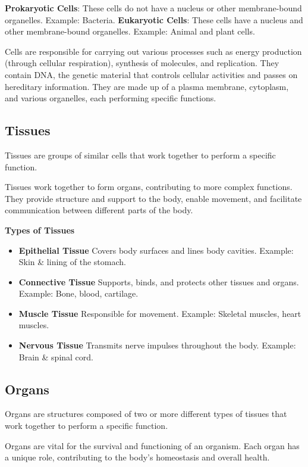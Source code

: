 \documentclass{article}
\begin{document}
\textbf{Prokaryotic Cells}: These cells do not have a nucleus or other membrane-bound organelles. Example: Bacteria.
\textbf{Eukaryotic Cells}: These cells have a nucleus and other membrane-bound organelles. Example: Animal and plant cells.

Cells are responsible for carrying out various processes such as energy production (through cellular respiration), synthesis of molecules, and replication.
They contain DNA, the genetic material that controls cellular activities and passes on hereditary information. They are made up of a plasma membrane, cytoplasm, and various organelles, each performing specific functions. \cite{stavans_1993_the}

\subsection{Tissues}
Tissues are groups of similar cells that work together to perform a specific function.

Tissues work together to form organs, contributing to more complex functions.
They provide structure and support to the body, enable movement, and facilitate communication between different parts of the body.

\textbf{Types of Tissues}
\begin{itemize}
    \item \textbf{Epithelial Tissue} Covers body surfaces and lines body cavities. Example: Skin \& lining of the stomach.
    \item \textbf{Connective Tissue} Supports, binds, and protects other tissues and organs. Example: Bone, blood, cartilage.
    \item \textbf{Muscle Tissue} Responsible for movement. Example: Skeletal muscles, heart muscles.
    \item \textbf{Nervous Tissue} Transmits nerve impulses throughout the body. Example: Brain \& spinal cord.
    \cite{overholtzer_2008_the}
\end{itemize}

\subsection{Organs}
Organs are structures composed of two or more different types of tissues that work together to perform a specific function.

Organs are vital for the survival and functioning of an organism.
Each organ has a unique role, contributing to the body's homeostasis and overall health.
\end{document}
